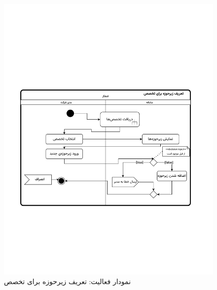 \begin{figure}[ht!]
	\centering
	\includegraphics[scale=0.8, page=1]{figs/OOD-activity-zirhozeh.pdf}
	\caption{نمودار فعالیت: تعریف زیرحوزه برای تخصص}
\end{figure}
\FloatBarrier
\newpage


